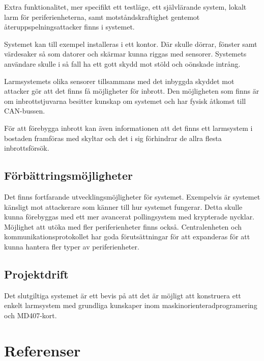 \documentclass[a4paper]{article}
\begin{document}
Extra funktionalitet, mer specifikt ett testläge, ett självlärande system, lokalt larm för periferienheterna, samt motståndskraftighet gentemot återuppspelningsattacker finns i systemet.

Systemet kan till exempel installeras i ett kontor.
Där skulle dörrar, fönster samt värdesaker så som datorer och skärmar kunna riggas med sensorer.
Systemets användare skulle i så fall ha ett gott skydd mot stöld och oönskade intrång.

Larmsystemets olika sensorer tillsammans med det inbyggda skyddet mot attacker gör att det finns få möjligheter för inbrott.
Den möjligheten som finns är om inbrottstjuvarna besitter kunskap om systemet och har fysisk åtkomst till CAN-bussen.

För att förebygga inbrott kan även informationen att det finns ett larmsystem i bostaden framföras med skyltar och det i sig förhindrar de allra flesta inbrottsförsök.

\subsection{Förbättringsmöjligheter}
Det finns fortfarande utvecklingsmöjligheter för systemet.
Exempelvis är systemet känsligt mot attackerare som känner till hur systemet fungerar.
Detta skulle kunna förebyggas med ett mer avancerat pollingsystem med krypterade nycklar.
Möjlighet att utöka med fler periferienheter finns också.
Centralenheten och kommunikationsprotokollet har goda förutsättningar för att expanderas för att kunna hantera fler typer av periferienheter.

\subsection{Projektdrift}
Det slutgiltiga systemet är ett bevis på att det är möjligt att konstruera ett enkelt larmsystem med grundliga kunskaper inom maskinorienteradprogramering och MD407-kort.

\section{Referenser}
\printbibliography[heading=none]
\end{document}
